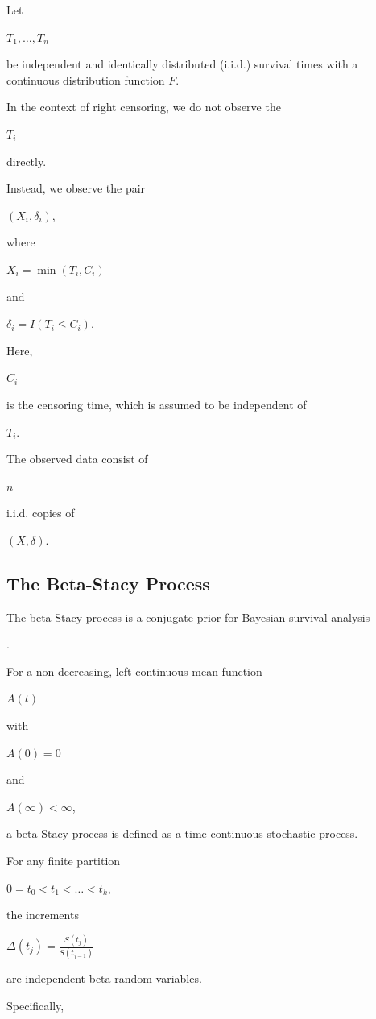 \documentclass[10pt,twoside]{article}
\numberwithin{equation}{section}
\begin{document}
Let 

$T_{1}, \ldots, T_{n}$

be independent and identically distributed (i.i.d.) survival times with a continuous distribution function $F$. 

In the context of right censoring, we do not observe the 

$T_i$ 

directly. 

Instead, we observe the pair 

$(X_i, \delta_i)$, 

where 

$X_i = \min(T_i, C_i)$ 

and 

$\delta_i = I(T_i \leq C_i)$. 

Here, 

$C_i$ 

is the censoring time, which is assumed to be independent of 

$T_i$. 

The observed data consist of 

$n$ 

i.i.d. copies of 

$(X, \delta)$. 



\subsection{The Beta-Stacy Process}

The beta-Stacy process is a conjugate prior for Bayesian survival analysis

\citep{12} . 

For a non-decreasing, left-continuous mean function 

$A(t)$ 

with 

$A(0)=0$ 

and 

$A(\infty)<\infty$, 

a beta-Stacy process is defined as a time-continuous stochastic process. 

For any finite partition 

$0 = t_0 < t_1 < \ldots < t_k$, 

the increments

$\Delta (t_j) = \frac{S(t_j)}{S(t_{j-1})}$

are independent beta random variables. 

Specifically,
\end{document}
